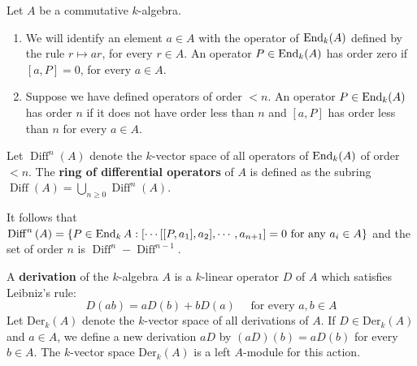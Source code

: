 \documentclass[12pt, oneside]{book}
\begin{document}
\begin{definition}
    Let $A$ be a commutative $k$-algebra.
    \begin{enumerate}[label=(\roman*)]
        \item
              We will identify an element $a \in A$ with the operator of $\operatorname{\operatorname{End}}_k(A)$
              defined by the rule $ r \mapsto ar$, for every $r \in A$.
              An operator $P \in \operatorname{\operatorname{End}}_k(A)$ has order zero if $[a, P] = 0$, for every $a \in A$.

        \item
              Suppose we have defined operators of order $< n$.
              An operator $P \in \operatorname{\operatorname{End}}_k(A)$ has order $n$ if
              it does not have order less than $n$ and $[a, P]$ has order less than $n$ for every
              $a \in A$.
    \end{enumerate}
    Let $\operatorname{Diff}^n(A)$ denote the $k$-vector space of all operators of $\operatorname{\operatorname{End}}_k(A)$ of order $<n$.
    The \textbf{ring of differential operators} of $A$ is defined as the subring $\operatorname{Diff}(A)=\bigcup_{n\geq 0} \operatorname{Diff}^n(A)$.
    \begin{remark}
        It follows that $\operatorname{Diff}^n\left(A\right)=\left\{P\in \operatorname{\operatorname{End}}_k A :[\cdots[[P,a_1],a_2],\cdots,a_{n+1}]=0 \text{ for any } a_i \in A \right\}$ and the set of order $n$ is $\operatorname{Diff}^n-\operatorname{Diff}^{n-1}$.
    \end{remark}
\end{definition}





\begin{definition}
    A \textbf{derivation} of the $k$-algebra $A$ is a $k$-linear operator $D$ of $A$
    which satisfies Leibniz's rule:
    \begin{equation*}
        D(ab) = aD(b) + bD(a)\quad \text{ for every } a, b \in A
    \end{equation*}
    Let $\mathrm{Der}_k (A)$ denote the $k$-vector space of all derivations of $A$.
    If $D\in  \mathrm{Der}_k (A)$ and $a \in A$, we define a new derivation $aD$ by $(aD)(b) = aD(b)$ for every $b\in A$.
    The $k$-vector space $\mathrm{Der}_k (A)$
    is a left $A$-module for this action.
\end{definition}
\end{document}
